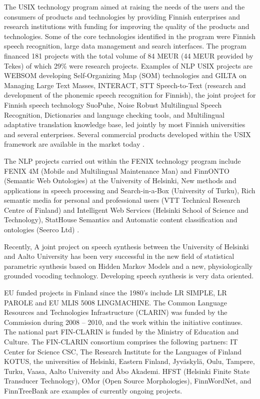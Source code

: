 \documentclass[]{../../metanetpaper}
\begin{document}
\begin{Parallel}[c]{70mm}{70mm}
{The USIX technology program aimed at raising the needs of the users and the
consumers of products and technologies by providing Finnish enterprises and
research institutions with funding for improving the quality of the products
and technologies. Some of the core technologies identified in the program were
Finnish speech recognition, large data management and search interfaces. The
program financed 181 projects with the total volume of 84 MEUR (44 MEUR
provided by Tekes) of which 29\% were research projects. Examples of NLP USIX
projects are WEBSOM developing Self-Organizing Map (SOM) technologies and GILTA
on Managing Large Text Masses, INTERACT, STT Speech-to-Text (research and
development of the phonemic speech recognition for Finnish), the joint project
for Finnish speech technology SuoPuhe, Noise Robust Multilingual Speech
Recognition, Dictionaries and language checking tools, and Multilingual
adaptative translation knowledge base, led jointly by most Finnish universities
and several enterprises. Several commercial products developed within the USIX
framework are available in the market today \cite{LoppuUSIX}.

The NLP projects carried out within the FENIX technology program include FENIX
4M (Mobile and Multilingual Maintenance Man) and FinnONTO (Semantic Web
Ontologies) at the University of Helsinki, New methods and applications in
speech processing and Search-in-a-Box (University of Turku), Rich semantic
media for personal and professional users (VTT Technical Research Centre of
Finland) and Intelligent Web Services (Helsinki School of Science and
Technology), StatHouse Semantics and Automatic content classification and
ontologies (Seerco Ltd) \cite{FinalFENIX}.

Recently, A joint project on speech synthesis between the University of
Helsinki and Aalto University has been very successful in the new field of
statistical parametric synthesis based on Hidden Markov Models and a new,
physiologically grounded vocoding technology. Developing speech synthesis is
very data oriented.

EU funded projects in Finland since the 1980’s include LR SIMPLE, LR
PAROLE and EU MLIS 5008 LINGMACHINE.  The Common Language Resources
and Technologies Infrastructure (CLARIN) was funded by the Commission
during 2008 – 2010, and the work within the initiative continues. The
national part FIN-CLARIN is funded by the Ministry of Education and
Culture. The FIN-CLARIN consortium comprises the following partners:
IT Center for Science CSC, The Research Institute for the Languages of
Finland KOTUS, the universities of Helsinki, Eastern Finland,
Jyväskylä, Oulu, Tampere, Turku, Vaasa, Aalto University and Åbo
Akademi. HFST (Helsinki Finite State Transducer Technology), OMor
(Open Source Morphologies), FinnWordNet, and FinnTreeBank are examples
of currently ongoing projects.

}
\end{Parallel}
\end{document}
